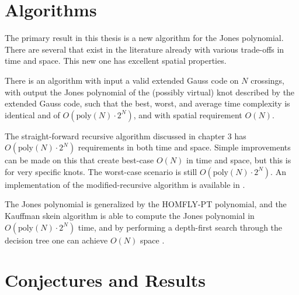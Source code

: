\section{Algorithms}
    The primary result in this thesis is a new algorithm for the Jones
    polynomial. There are several that exist in the literature already with
    various trade-offs in time and space. This new one has excellent spatial
    properties.
    \begin{theorem}
        There is an algorithm with input a valid extended Gauss code on $N$
        crossings, with output the Jones polynomial of the (possibly virtual)
        knot described by the extended Gauss code, such that the best, worst,
        and average time complexity is identical and of
        $O(\textrm{poly}(N)\cdot{2}^{N})$, and with spatial requirement $O(N)$.
    \end{theorem}
    The straight-forward recursive algorithm discussed in chapter 3 has
    $O(\textrm{poly}(N)\cdot{2}^{N})$ requirements in both time and space.
    Simple improvements can be made on this that create best-case $O(N)$ in
    time and space, but this is for very specific knots. The worst-case scenario
    is still $O(\textrm{poly}(N)\cdot{2}^{N})$. An implementation of the
    modified-recursive algorithm is available in \cite{sage}.
    \par\hfill\par
    The Jones polynomial is generalized by the HOMFLY-PT polynomial, and the
    Kauffman skein algorithm is able to compute the Jones polynomial in
    $O(\textrm{poly}(N)\cdot{2}^{N})$ time, and by performing a depth-first
    search through the decision tree one can achieve $O(N)$ space
    \cite{Burton2018HOMFLFixedParameter}.
\section{Conjectures and Results}
